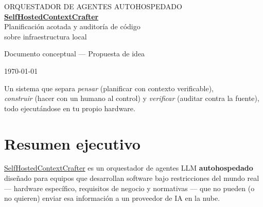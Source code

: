 \documentclass[11pt]{article}
\begin{document}
\begin{titlepage}
\centering
\vspace*{2.2cm}

{\color{softGray}\large ORQUESTADOR DE AGENTES AUTOHOSPEDADO}\\[0.6cm]

{\Huge\bfseries\color{inkNavy} \href{https://github.com/dramirezbe/SelfHostedContextCrafter}{SelfHostedContextCrafter}}\\[0.5cm]

{\Large\color{accentTeal} Planificación acotada y auditoría de código\\ sobre infraestructura local}

\vspace{1.8cm}


\vspace{1.8cm}

{\large\color{softGray} Documento conceptual --- Propuesta de idea}

\vspace{0.4cm}

{\color{softGray} \today}

\vfill

{\small\color{softGray} Un sistema que separa \emph{pensar} (planificar con contexto verificable),\\ \emph{construir} (hacer con un humano al control) y \emph{verificar} (auditar contra la fuente),\\ todo ejecutándose en tu propio hardware.}

\end{titlepage}

\section*{Resumen ejecutivo}

\href{https://github.com/dramirezbe/SelfHostedContextCrafter}{SelfHostedContextCrafter} es un orquestador de agentes LLM \textbf{autohospedado} diseñado para equipos que desarrollan software bajo restricciones del mundo real --- hardware específico, requisitos de negocio y normativas --- que no pueden (o no quieren) enviar esa información a un proveedor de IA en la nube.
\end{document}
